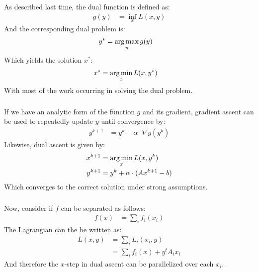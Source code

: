 \begin{frame}[fragile] \frametitle{}

As described last time, the dual function is defined as:
\begin{align*}
g(y) &= \inf_x L(x,y)
\end{align*}
And the corresponding dual problem is:
\begin{align*}
y^{*} &= \mathop{\mathrm{arg\,max}}_y g(y)
\end{align*}
Which yields the solution $x^{*}$:
\begin{align*}
x^{*} &= \mathop{\mathrm{arg\,min}}_x L(x, y^{*})
\end{align*}
With most of the work occurring in solving the dual problem.

\end{frame}

\begin{frame}[fragile] \frametitle{}

If we have an analytic form of the function $g$ and its gradient,
gradient ascent can be used to repeatedly update $y$ until convergence
by:
\begin{align*}
y^{k+1} &= y^{k} + \alpha \cdot \nabla g (y^k)
\end{align*}
\pause Likewise, dual ascent is given by:
\begin{align*}
x^{k+1} &= \mathop{\mathrm{arg\,min}}_x L(x, y^k) \\
y^{k+1} &= y^{k} + \alpha \cdot (A x^{k+1} - b)
\end{align*}
Which converges to the correct solution under strong assumptions.

\end{frame}

\begin{frame}[fragile] \frametitle{}

Now, consider if $f$ can be separated as follows:
\begin{align*}
f(x) &= \sum_i f_i (x_i)
\end{align*}
The Lagrangian can the be written as:
\begin{align*}
L(x,y) &= \sum_i L_i (x_i, y) \\
&= \sum_i f_i(x) + y^t A_i x_i
\end{align*}
And therefore the $x$-step in dual ascent can be parallelized over each
$x_i$.

\end{frame}

